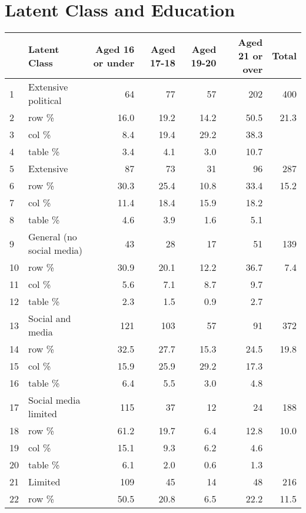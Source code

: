 \documentclass{article}
\begin{document}


\section{Latent Class and Education}

\begin{table}[ht]
\centering
\begin{tabular}{llrrrrr}
  \hline
 & Latent Class & Aged 16 or under & Aged 17-18 & Aged 19-20 & Aged 21 or over & Total \\ 
  \hline
1 & Extensive political & 64 & 77 & 57 & 202 & 400 \\ 
  2 & row \% & 16.0 & 19.2 & 14.2 & 50.5 & 21.3 \\ 
  3 & col \% & 8.4 & 19.4 & 29.2 & 38.3 &  \\ 
  4 & table \% & 3.4 & 4.1 & 3.0 & 10.7 &  \\ 
  5 & Extensive & 87 & 73 & 31 & 96 & 287 \\ 
  6 & row \% & 30.3 & 25.4 & 10.8 & 33.4 & 15.2 \\ 
  7 & col \% & 11.4 & 18.4 & 15.9 & 18.2 &  \\ 
  8 & table \% & 4.6 & 3.9 & 1.6 & 5.1 &  \\ 
  9 & General (no social media) & 43 & 28 & 17 & 51 & 139 \\ 
  10 & row \% & 30.9 & 20.1 & 12.2 & 36.7 & 7.4 \\ 
  11 & col \% & 5.6 & 7.1 & 8.7 & 9.7 &  \\ 
  12 & table \% & 2.3 & 1.5 & 0.9 & 2.7 &  \\ 
  13 & Social and media & 121 & 103 & 57 & 91 & 372 \\ 
  14 & row \% & 32.5 & 27.7 & 15.3 & 24.5 & 19.8 \\ 
  15 & col \% & 15.9 & 25.9 & 29.2 & 17.3 &  \\ 
  16 & table \% & 6.4 & 5.5 & 3.0 & 4.8 &  \\ 
  17 & Social media limited & 115 & 37 & 12 & 24 & 188 \\ 
  18 & row \% & 61.2 & 19.7 & 6.4 & 12.8 & 10.0 \\ 
  19 & col \% & 15.1 & 9.3 & 6.2 & 4.6 &  \\ 
  20 & table \% & 6.1 & 2.0 & 0.6 & 1.3 &  \\ 
  21 & Limited & 109 & 45 & 14 & 48 & 216 \\ 
  22 & row \% & 50.5 & 20.8 & 6.5 & 22.2 & 11.5 \\ 

\end{tabular}
\end{table}
\end{document}

